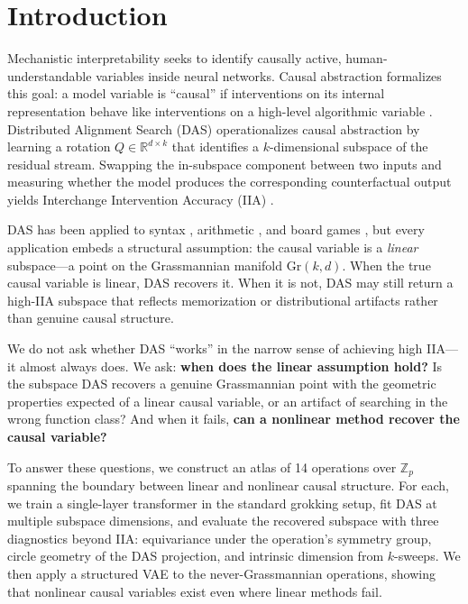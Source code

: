 \documentclass{article}
\newcommand{\Gr}{\mathrm{Gr}}
\newcommand{\R}{\mathbb{R}}
\newcommand{\Z}{\mathbb{Z}}
\begin{document}
\section{Introduction}
\label{sec:intro}

Mechanistic interpretability seeks to identify causally active,
human-understandable variables inside neural networks. Causal abstraction
formalizes this goal: a model variable is ``causal'' if interventions on its
internal representation behave like interventions on a high-level algorithmic
variable \citep{geiger2021causal}. Distributed Alignment Search (DAS)
operationalizes causal abstraction by learning a rotation $Q \in \R^{d \times k}$
that identifies a $k$-dimensional subspace of the residual stream. Swapping the
in-subspace component between two inputs and measuring whether the model
produces the corresponding counterfactual output yields Interchange Intervention
Accuracy (IIA) \citep{geiger2023finding}.

DAS has been applied to syntax \citep{geiger2023finding}, arithmetic
\citep{wu2024interpretability}, and board games \citep{li2023emergent}, but
every application embeds a structural assumption: the causal variable is a
\emph{linear} subspace---a point on the Grassmannian manifold $\Gr(k,d)$. When
the true causal variable is linear, DAS recovers it. When it is not, DAS may
still return a high-IIA subspace that reflects memorization or distributional
artifacts rather than genuine causal structure.

We do not ask whether DAS ``works'' in the narrow sense of achieving high IIA---it
almost always does. We ask: \textbf{when does the linear assumption hold?} Is the
subspace DAS recovers a genuine Grassmannian point with the geometric properties
expected of a linear causal variable, or an artifact of searching in the wrong
function class? And when it fails, \textbf{can a nonlinear method recover the
causal variable?}

To answer these questions, we construct an atlas of 14 operations over $\Z_p$
spanning the boundary between linear and nonlinear causal structure. For each, we
train a single-layer transformer in the standard grokking setup, fit DAS at
multiple subspace dimensions, and evaluate the recovered subspace with three
diagnostics beyond IIA: equivariance under the operation's symmetry group, circle
geometry of the DAS projection, and intrinsic dimension from $k$-sweeps. We then
apply a structured VAE \citep{narayanaswamy2017learning} to the
never-Grassmannian operations, showing that nonlinear causal variables exist even
where linear methods fail.
\end{document}

